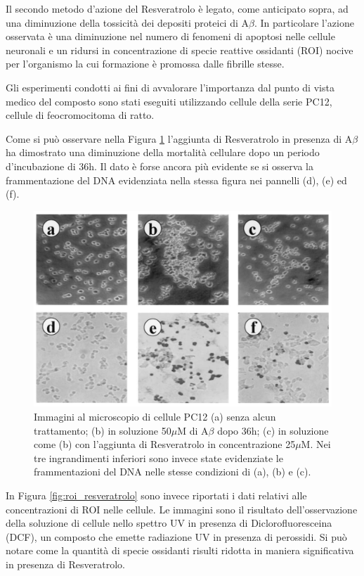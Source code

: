 \documentclass[a4paper, 12pt]{article}
\begin{document}
Il secondo metodo d'azione del Resveratrolo è legato, come anticipato sopra, ad una diminuzione della tossicità dei depositi proteici di A$\beta$. In particolare l'azione osservata è una diminuzione nel numero di fenomeni di  apoptosi nelle cellule neuronali e un ridursi in concentrazione di specie reattive ossidanti (ROI) nocive per l'organismo la cui formazione è promossa dalle fibrille stesse.

Gli esperimenti condotti ai fini di avvalorare l'importanza dal punto di vista medico del composto sono stati eseguiti utilizzando cellule della serie PC12, cellule di feocromocitoma di ratto.

Come si può osservare nella Figura \ref{fig:apo_resveratrolo} l'aggiunta di Resveratrolo in presenza di A$\beta$ ha dimostrato una diminuzione della mortalità cellulare dopo un periodo d'incubazione di 36h. Il dato è forse ancora più evidente se si osserva la frammentazione del DNA evidenziata nella stessa figura nei pannelli (d), (e) ed (f).

\begin{figure}[H]
	\centering
	\includegraphics[width=\linewidth]{immagini/apo_resveratrolo.png}
	\caption{Immagini al microscopio di cellule PC12 (a) senza alcun trattamento; (b) in soluzione 50$\mu$M di A$\beta$ dopo 36h; (c) in soluzione come (b) con l'aggiunta di Resveratrolo in concentrazione 25$\mu$M. Nei tre ingrandimenti inferiori sono invece state evidenziate le frammentazioni del DNA nelle stesse condizioni di (a), (b) e (c).}
	\label{fig:apo_resveratrolo}
\end{figure}

In Figura \ref{fig:roi_resveratrolo} sono invece riportati i dati relativi alle concentrazioni di ROI nelle cellule. Le immagini sono il risultato dell'osservazione della soluzione di cellule nello spettro UV in presenza di Diclorofluoresceina (DCF), un composto che emette radiazione UV in presenza di perossidi. Si può notare come la quantità di specie ossidanti risulti ridotta in maniera significativa in presenza di Resveratrolo. \cite{noauthor_protective_2003}
\end{document}
